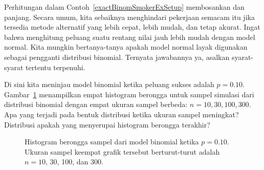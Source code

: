 Perhitungan dalam Contoh~\ref{exactBinomSmokerExSetup} membosankan dan
panjang. Secara umum, kita sebaiknya menghindari pekerjaan semacam itu
jika tersedia metode alternatif yang lebih cepat, lebih mudah, dan tetap
akurat. Ingat bahwa menghitung peluang suatu rentang nilai jauh lebih
mudah dengan model normal. Kita mungkin bertanya-tanya apakah model normal
layak digunakan sebagai pengganti distribusi binomial. Ternyata jawabannya
ya, asalkan syarat-syarat tertentu terpenuhi.

\begin{exercisewrap}
\begin{nexercise}
Di sini kita meninjau model binomial ketika peluang sukses adalah
$p=0.10$. Gambar~\ref{fourBinomialModelsShowingApproxToNormal}
menampilkan empat histogram berongga untuk sampel simulasi dari distribusi
binomial dengan empat ukuran sampel berbeda: $n=10, 30, 100, 300$.
Apa yang terjadi pada bentuk distribusi ketika ukuran sampel meningkat?
Distribusi apakah yang menyerupai histogram berongga terakhir?\footnotemark{}
\end{nexercise}
\end{exercisewrap}

\begin{figure}[h]
  \centering
  \caption{Histogram berongga sampel dari model binomial ketika
      $p=0.10$. Ukuran sampel keempat grafik tersebut berturut-turut
      adalah $n=10$, 30, 100, dan 300.}
  \label{fourBinomialModelsShowingApproxToNormal}
\end{figure}

